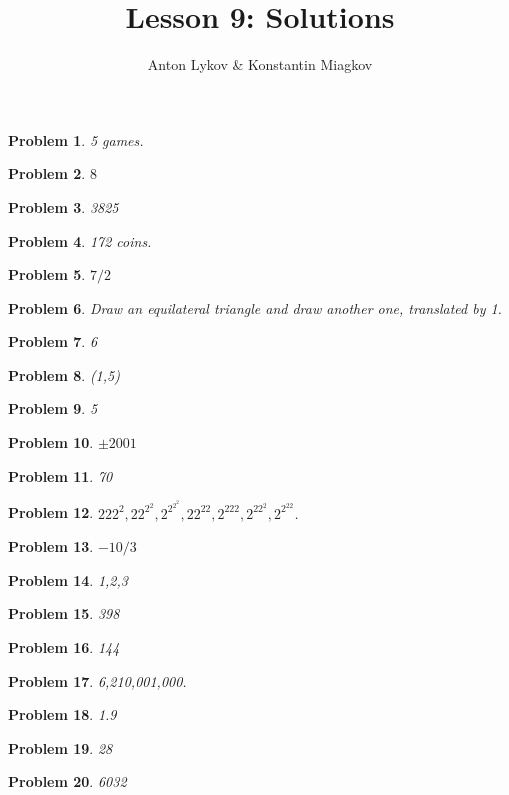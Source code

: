 \documentclass[a4paper,12pt]{article}
\author{Anton Lykov \& Konstantin Miagkov}
\title{Lesson 9: Solutions}
\theoremstyle{perfect}
\newtheorem{prb}{Problem}
\begin{document}
 
\maketitle

\begin{prb}
5 games.
\end{prb}

\begin{prb}
$8$
\end{prb}

\begin{prb}
3825
\end{prb}

\begin{prb}
172 coins.
\end{prb}

\begin{prb}
$7/2$
\end{prb}

\begin{prb}
Draw an equilateral triangle and draw another one, translated by 1.
\end{prb}

\begin{prb}
6
\end{prb}

\begin{prb}
(1,5)
\end{prb}


\begin{prb}
5
\end{prb}

\begin{prb}
$\pm 2001$
\end{prb}

\begin{prb}
70
\end{prb}


\begin{prb}
$222^2, 22^{2^2}, 2^{2^{2^2}}, 22^{22}, 2^{222}, 2^{22^2}, 2^{2^{22}}$.
\end{prb}

\begin{prb}
$- 10/3$
\end{prb}


\begin{prb}
1,2,3
\end{prb}

\begin{prb}
398
\end{prb}


\begin{prb}
144
\end{prb}

\begin{prb}
6,210,001,000.
\end{prb}

\begin{prb}
1.9
\end{prb}

\begin{prb}
28
\end{prb}

\begin{prb}
6032
\end{prb}
\end{document}
